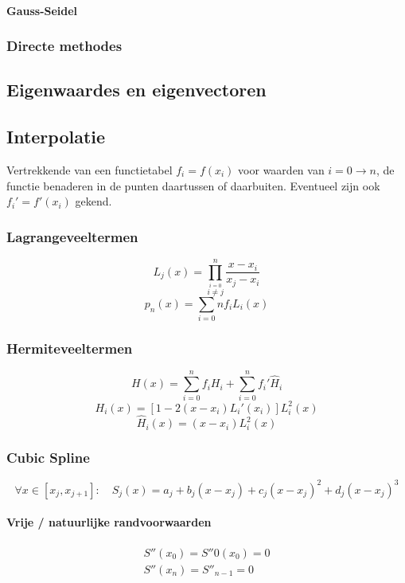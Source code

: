 \paragraph{Gauss-Seidel}


\subsubsection{Directe methodes}
\label{sec:NALinSDirect}



\subsection{Eigenwaardes en eigenvectoren}

\subsection{Interpolatie}
Vertrekkende van een functietabel $f_i = f(x_i)$ voor waarden van $i = 0 \to n$,
de functie benaderen in de punten daartussen of daarbuiten. Eventueel zijn ook $f_i' = f'(x_i)$ gekend.

\subsubsection{Lagrangeveeltermen}
\[
  L_j(x) = \prod_{\stackrel{i=0}{i\neq j}}^n \frac{x-x_i}{x_j-x_i}
\]
\[
  p_n(x) = \sum_{i=0}{n} f_i L_i(x)
\]

\subsubsection{Hermiteveeltermen}
\[
  H(x) = \sum_{i=0}^n f_i H_{i} + \sum_{i=0}^n f_i' \hat{H}_{i}
\]
\[
  H_{i}(x) = \left[  1 - 2(x-x_i) L_i'(x_i)\right]L_i^2(x)
\]
\[
  \hat{H}_i(x) = (x-x_i)L_i^2(x)
\]

\subsubsection{Cubic Spline}
\[
  \forall x \in [x_j,x_{j+1}]:\quad S_j(x) = a_j + b_j(x-x_j) + c_j(x-x_j)^2 + d_j(x-x_j)^3
\]
\paragraph{Vrije / natuurlijke randvoorwaarden}
\[
  \begin{array}{l}
    S''(x_0) = S''0(x_0) = 0\\
    S''(x_n) = S''_{n-1} = 0
  \end{array}
\]

